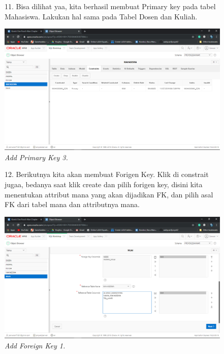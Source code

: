 \begin{enumerate}
    \begin{figure}[!htbp]
    \item[11.] Bisa dilihat yaa, kita berhasil membuat Primary key pada tabel Mahasiswa. Lakukan hal sama pada Tabel Dosen dan Kuliah.
    \begin{center}
    \includegraphics[scale=0.3]{figures/Screenshot(128).png}
    \caption{\textit{Add Primary Key 3.}}
    \end{center}   
    \end{figure}
    
    \begin{figure}[!htbp]
    \item[12.] Berikutnya kita akan membuat Forigen Key. Klik di constrait jugaa, bedanya saat klik create dan pilih forigen key, disini kita menentukan attribut mana yang akan dijadikan FK, dan pilih asal FK dari tabel mana dan attributnya mana.
    \begin{center}
    \includegraphics[scale=0.3]{figures/Screenshot(130).png}
    \caption{\textit{Add Foreign Key 1.}}
    \end{center}   
    \end{figure}
    

\end{enumerate}
